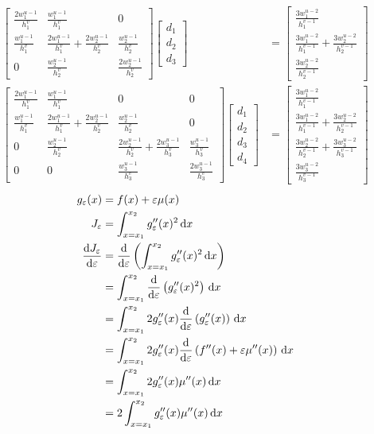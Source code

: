 \documentclass{article}
\begin{document}
\begin{align*}
  \begin{bmatrix}
    \frac{2w_1^{u-1}}{h_1^v} & \frac{w_1^{u-1}}{h_1^v} & 0 \\
    \frac{w_1^{u-1}}{h_1^v} & \frac{2w_1^{u-1}}{h_1^v}+\frac{2w_2^{u-1}}{h_2^v} & \frac{w_2^{u-1}}{h_2^v} \\
    0 & \frac{w_2^{u-1}}{h_2^v} & \frac{2w_2^{u-1}}{h_2^v}
  \end{bmatrix}
  \begin{bmatrix}
    d_1 \\ d_2 \\ d_3
  \end{bmatrix}
  &= 
  \begin{bmatrix}
    \frac{3w_1^{u-2}}{h_1^{v-1}} \\
    \frac{3w_1^{u-2}}{h_1^{v-1}}+\frac{3w_2^{u-2}}{h_2^{v-1}} \\
    \frac{3w_2^{u-2}}{h_2^{v-1}}
  \end{bmatrix} \\
  \begin{bmatrix}
    \frac{2w_1^{u-1}}{h_1^v} & \frac{w_1^{u-1}}{h_1^v} & 0 & 0\\
    \frac{w_1^{u-1}}{h_1^v} & \frac{2w_1^{u-1}}{h_1^v}+\frac{2w_2^{u-1}}{h_2^v} & \frac{w_2^{u-1}}{h_2^v} & 0 \\
    0 & \frac{w_2^{u-1}}{h_2^v} & \frac{2w_2^{u-1}}{h_2^v}+\frac{2w_3^{u-1}}{h_3^v} & \frac{w_3^{u-1}}{h_3^v} \\
    0 & 0 & \frac{w_3^{u-1}}{h_3^v} & \frac{2w_3^{u-1}}{h_3^v}
  \end{bmatrix}
  \begin{bmatrix}
    d_1 \\ d_2 \\ d_3 \\ d_4
  \end{bmatrix}
  &= 
  \begin{bmatrix}
    \frac{3w_1^{u-2}}{h_1^{v-1}} \\
    \frac{3w_1^{u-2}}{h_1^{v-1}}+\frac{3w_2^{u-2}}{h_2^{v-1}} \\
    \frac{3w_2^{u-2}}{h_2^{v-1}}+\frac{3w_3^{u-2}}{h_3^{v-1}} \\
    \frac{3w_3^{u-2}}{h_3^{v-1}}
  \end{bmatrix}
\end{align*}
\newcommand{\e}{\varepsilon}
\begin{align*}
  g_\e(x) &= f(x)+\e\mu(x) \\
  J_\e &= \int_{x=x_1}^{x_2} g_\e''(x)^2 \dx \\
  \dd{J_\e}{\e} &= \dd{}{\e}\left(\int_{x=x_1}^{x_2} g_\e''(x)^2 \dx\right) \\
  &= \int_{x=x_1}^{x_2} \dd{}{\e}\left(g_\e''(x)^2\right) \dx \\
  &= \int_{x=x_1}^{x_2} 2g_\e''(x)\dd{}{\e}\left(g_\e''(x)\right) \dx \\
  &= \int_{x=x_1}^{x_2} 2g_\e''(x)\dd{}{\e}\left(f''(x)+\e\mu''(x)\right) \dx \\
  &= \int_{x=x_1}^{x_2} 2g_\e''(x)\mu''(x) \dx \\
  &= 2\int_{x=x_1}^{x_2} g_\e''(x)\mu''(x) \dx
\end{align*}
\end{document}
